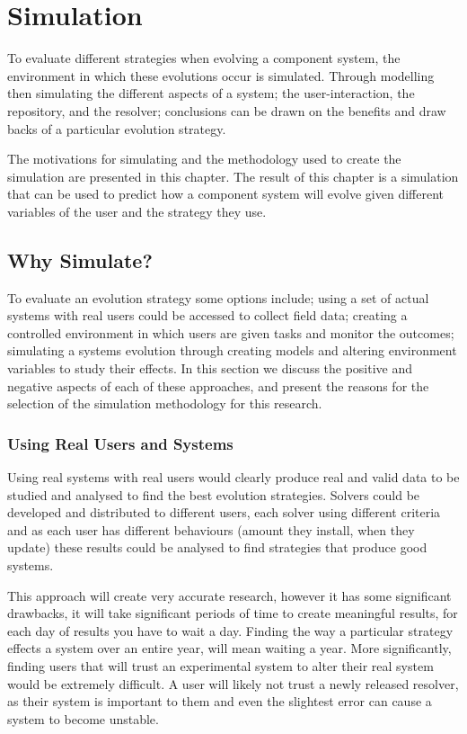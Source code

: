 \chapter{Simulation}
\label{simulation}
{}To evaluate different strategies when evolving a component system, the environment in which these evolutions occur is simulated.
{}Through modelling then simulating the different aspects of a system; the user-interaction, the repository, and the resolver;
{}conclusions can be drawn on the benefits and draw backs of a particular evolution strategy.

{}The motivations for simulating and the methodology used to create the simulation are presented in this chapter.
{}The result of this chapter is a simulation that can be used to predict how a component system will evolve given different variables of the user and the strategy they use.

\section{Why Simulate?}
To evaluate an evolution strategy some options include;
using a set of actual systems with real users could be accessed to collect field data;
creating a controlled environment in which users are given tasks and monitor the outcomes;
simulating a systems evolution through creating models and altering environment variables to study their effects.
In this section we discuss the positive and negative aspects of each of these approaches,
and present the reasons for the selection of the simulation methodology for this research.

\subsection{Using Real Users and Systems}
Using real systems with real users would clearly produce real and valid data to be studied and analysed to find the best evolution strategies.
Solvers could be developed and distributed to different users, each solver using different criteria 
and as each user has different behaviours (amount they install, when they update)
these results could be analysed to find strategies that produce good systems. 

This approach will create very accurate research, however it has some significant drawbacks,
it will take significant periods of time to create meaningful results, for each day of results you have to wait a day.
Finding the way a particular strategy effects a system over an entire year, will mean waiting a year.
More significantly, finding users that will trust an experimental system to alter their real system would be extremely difficult.   
A user will likely not trust a newly released resolver, as their system is important to them and even the slightest error can cause
a system to become unstable.

